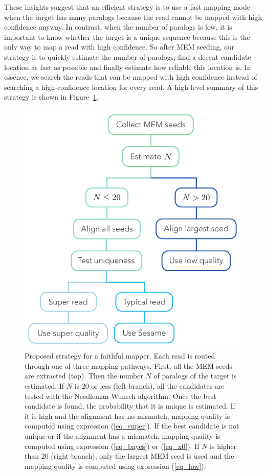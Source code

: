 \documentclass[english]{article}
\begin{document}
These insights suggest that an efficient strategy is to use a fast mapping
mode when the target has many paralogs because the read cannot be mapped
with high confidence anyway. In contrast, when the number of paralogs is
low, it is important to know whether the target is a unique sequence
because this is the only way to map a read with high confidence. So after
MEM seeding, our strategy is to quickly estimate the number of paralogs,
find a decent candidate location as fast as possible and finally estimate
how reliable this location is. In essence, we search the reads that
can be mapped with high confidence instead of searching a high-confidence
location for every read. A high-level summary of this strategy is shown in
Figure~\ref{fig_tree}.

\begin{figure}[h]
\begin{center}
\includegraphics[scale=.8]{decision_tree.pdf}
\end{center}
\caption{Proposed strategy for a faithful mapper. Each read is routed
through one of three mapping pathways. First, all the MEM seeds are
extracted (top). Then the number $N$ of paralogs of the target is
estimated. If $N$ is 20 or less (left branch), all the candidates are
tested with the Needleman-Wunsch algorithm. Once the best candidate is
found, the probability that it is unique is estimated. If it is high and
the alignment has no mismatch, mapping quality is computed using
expression (\ref{eq_super}). If the best candidate is not unique or if the
alignment has a mismatch, mapping quality is computed using expression
(\ref{eq_bayes}) or (\ref{eq_x0}). If $N$ is higher than 20 (right
branch), only the largest MEM seed is used and the mapping quality is
computed using expression (\ref{eq_low}).}
\label{fig_tree}
\end{figure}
\end{document}
